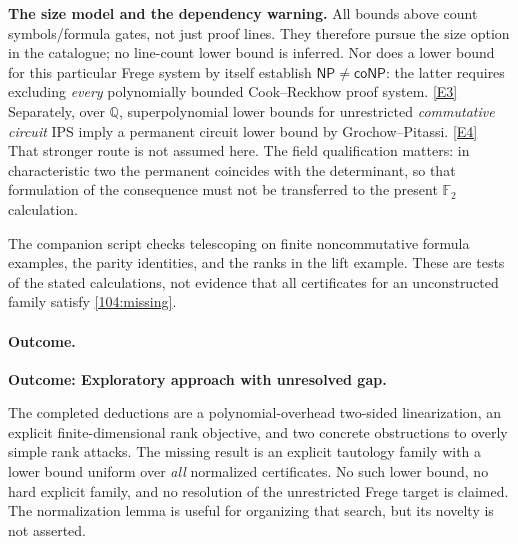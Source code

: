 \documentclass[11pt,a4paper]{article}
\newcommand{\Q}{\mathbb{Q}}
\newcommand{\eref}[2]{\hyperlink{extra:#1:#2}{[E#2]}}
\numberwithin{equation}{section}
\begin{document}
\textbf{The size model and the dependency warning.}
All bounds above count symbols/formula gates, not just proof lines. They
therefore pursue the size option in the catalogue; no line-count lower bound
is inferred. Nor does a lower bound for this particular Frege system by
itself establish $\mathsf{NP}\ne\mathsf{coNP}$: the latter requires excluding
\emph{every} polynomially bounded Cook--Reckhow proof system.
\eref{104}{3} Separately, over $\Q$, superpolynomial lower bounds for unrestricted
\emph{commutative circuit} IPS imply a permanent circuit lower bound by
Grochow--Pitassi. \eref{104}{4} That stronger route is not assumed here.
The field qualification matters: in characteristic two the permanent
coincides with the determinant, so that formulation of the consequence
must not be transferred to the present $\mathbb F_2$ calculation.

The companion script checks telescoping on finite noncommutative formula
examples, the parity identities, and the ranks in the lift example. These
are tests of the stated calculations, not evidence that all certificates
for an unconstructed family satisfy \eqref{104:missing}.

\paragraph{Outcome.}
\textbf{Outcome: Exploratory approach with unresolved gap.}

The completed deductions are a polynomial-overhead two-sided linearization,
an explicit finite-dimensional rank objective, and two concrete obstructions
to overly simple rank attacks. The missing result is an explicit tautology
family with a lower bound uniform over \emph{all} normalized certificates.
No such lower bound, no hard explicit family, and no resolution of the
unrestricted Frege target is claimed. The normalization lemma is useful for
organizing that search, but its novelty is not asserted.
\end{document}

